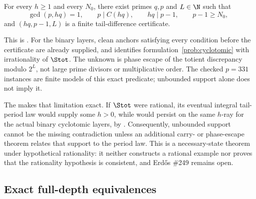 \begin{equivform}\label{prob:cyclotomic}
For every $h\ge1$ and every $N_0$, there exist primes $q,p$ and $L\in\N$ such
that
\[
 \gcd(p,hq)=1,\qquad p\mid C(hq),\qquad hq\mid p-1,
 \qquad p-1\ge N_0,
\]
and $(hq,p-1,L)$ is a finite tail-difference certificate.
\end{equivform}

\noindent This is
.
For the binary layers, clean anchors satisfying every condition before the
certificate are already supplied, and
identifies formulation~\ref{prob:cyclotomic} with irrationality of $\Stot$.
The unknown is phase escape of the totient discrepancy modulo $2^L$, not
large prime divisors or multiplicative order.  The checked $p=331$ instances
are finite models of this exact predicate; unbounded support alone does not
imply it.

The
makes that limitation exact.  If $\Stot$ were rational, its eventual integral
tail-period law would supply some $h>0$, while
would persist on the same $h$-ray for the actual binary cyclotomic layers, by
.
Consequently, unbounded support cannot be the missing contradiction unless an
additional carry- or phase-escape theorem relates that support to the period
law.  This is a necessary-state theorem under hypothetical rationality: it
neither constructs a rational example nor proves that the rationality
hypothesis is consistent, and Erd\H{o}s \#249 remains open.

\subsection{Exact full-depth equivalences}

